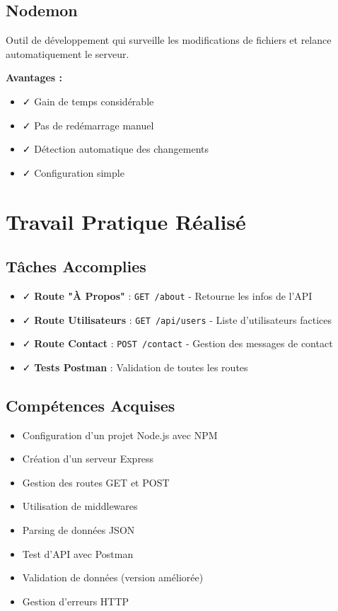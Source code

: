 \documentclass[12pt,a4paper]{article}
\begin{document}
\subsection{Nodemon}
Outil de développement qui surveille les modifications de fichiers et relance automatiquement le serveur.

\textbf{Avantages :}
\begin{itemize}
    \item ✓ Gain de temps considérable
    \item ✓ Pas de redémarrage manuel
    \item ✓ Détection automatique des changements
    \item ✓ Configuration simple
\end{itemize}

\section{Travail Pratique Réalisé}

\subsection{Tâches Accomplies}

\begin{itemize}
    \item ✓ \textbf{Route "À Propos"} : \texttt{GET /about} - Retourne les infos de l'API
    \item ✓ \textbf{Route Utilisateurs} : \texttt{GET /api/users} - Liste d'utilisateurs factices
    \item ✓ \textbf{Route Contact} : \texttt{POST /contact} - Gestion des messages de contact
    \item ✓ \textbf{Tests Postman} : Validation de toutes les routes
\end{itemize}

\subsection{Compétences Acquises}

\begin{itemize}
    \item Configuration d'un projet Node.js avec NPM
    \item Création d'un serveur Express
    \item Gestion des routes GET et POST
    \item Utilisation de middlewares
    \item Parsing de données JSON
    \item Test d'API avec Postman
    \item Validation de données (version améliorée)
    \item Gestion d'erreurs HTTP
\end{itemize}
\end{document}
